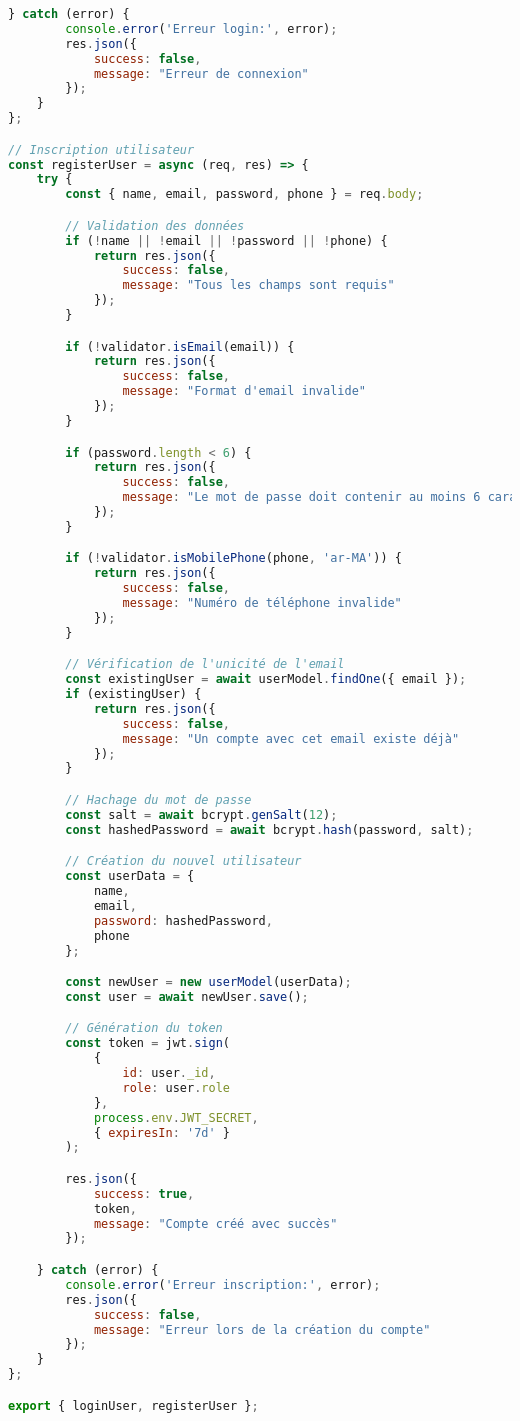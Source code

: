 \begin{lstlisting}[language=JavaScript, caption=userController.js (extrait)]
    } catch (error) {
        console.error('Erreur login:', error);
        res.json({ 
            success: false, 
            message: "Erreur de connexion" 
        });
    }
};

// Inscription utilisateur
const registerUser = async (req, res) => {
    try {
        const { name, email, password, phone } = req.body;

        // Validation des données
        if (!name || !email || !password || !phone) {
            return res.json({ 
                success: false, 
                message: "Tous les champs sont requis" 
            });
        }

        if (!validator.isEmail(email)) {
            return res.json({ 
                success: false, 
                message: "Format d'email invalide" 
            });
        }

        if (password.length < 6) {
            return res.json({ 
                success: false, 
                message: "Le mot de passe doit contenir au moins 6 caractères" 
            });
        }

        if (!validator.isMobilePhone(phone, 'ar-MA')) {
            return res.json({ 
                success: false, 
                message: "Numéro de téléphone invalide" 
            });
        }

        // Vérification de l'unicité de l'email
        const existingUser = await userModel.findOne({ email });
        if (existingUser) {
            return res.json({ 
                success: false, 
                message: "Un compte avec cet email existe déjà" 
            });
        }

        // Hachage du mot de passe
        const salt = await bcrypt.genSalt(12);
        const hashedPassword = await bcrypt.hash(password, salt);

        // Création du nouvel utilisateur
        const userData = {
            name,
            email,
            password: hashedPassword,
            phone
        };

        const newUser = new userModel(userData);
        const user = await newUser.save();

        // Génération du token
        const token = jwt.sign(
            { 
                id: user._id,
                role: user.role 
            }, 
            process.env.JWT_SECRET,
            { expiresIn: '7d' }
        );

        res.json({ 
            success: true, 
            token,
            message: "Compte créé avec succès"
        });

    } catch (error) {
        console.error('Erreur inscription:', error);
        res.json({ 
            success: false, 
            message: "Erreur lors de la création du compte" 
        });
    }
};

export { loginUser, registerUser };
\end{lstlisting}


